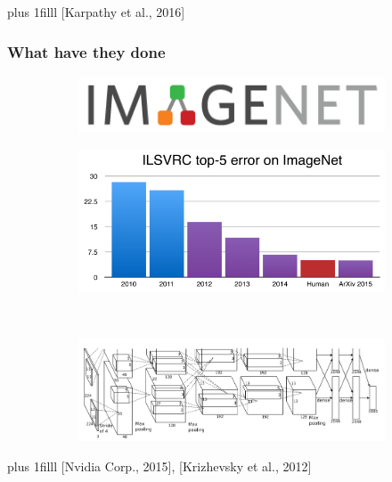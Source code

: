 \documentclass{beamer}
\newcommand{\source}[1]{\vskip0pt plus 1filll \scriptsize #1}
\begin{document}
\begin{frame}
\begin{figure}[h]
\begin{subfigure}{0.5\textwidth}
\begin{subfigure}{\textwidth}
				\end{subfigure}
			\end{subfigure}
		\end{figure}
		\source{[Karpathy et al., 2016]}
	\end{frame}
		
	\begin{frame}
		\frametitle{What have they done}
		\vspace{30pt}
		\begin{figure}[h]
			\centering
			\begin{subfigure}{\textwidth}
				\includegraphics[width=\textwidth]{plots/imageNetLogo.png}
			\end{subfigure}
			\par\smallskip
			\begin{subfigure}{0.35\textwidth}
				\includegraphics[width=\textwidth]{plots/imageNetAdvances.png}
			\end{subfigure}
			~
			\begin{subfigure}{0.6\textwidth}
				\includegraphics[width=\textwidth]{plots/alexnet.png}
			\end{subfigure}
		\end{figure}
		\source{[Nvidia Corp., 2015], [Krizhevsky et al., 2012]}
	\end{frame}
	
\end{document}
